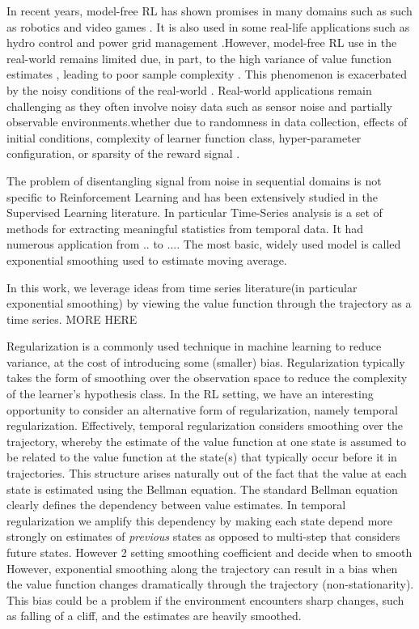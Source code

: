 In recent years, model-free RL has shown promises in many domains such as  such as robotics \citep{kober2013reinforcement,abbeel2010autonomous} and video games \citep{vinyals2017starcraft,mnih2013playing,mnih2016asynchronous}. It is also used in some real-life applications such as hydro control \citep{grinberg2014optimizing} and power grid management \citep{franccois2016deep}.However, model-free RL use in the real-world remains limited due, in part, to the high variance of value function estimates \citep{greensmith2004variance}, leading to poor sample complexity \citep{glascher2010states,kakade2003sample}. This phenomenon is exacerbated by the noisy conditions of the real-world \citep{fox2015taming,pendrith1994reinforcement}. Real-world applications remain challenging as they often involve noisy data such as sensor noise and partially observable environments.whether due to randomness in data collection, effects of initial conditions, complexity of learner function class, hyper-parameter configuration, or sparsity of the reward signal \citep{henderson2017deep}.
 
The problem of disentangling signal from noise in sequential domains is not specific to Reinforcement Learning and has been extensively studied in the Supervised Learning literature. In particular Time-Series analysis is a set of methods for extracting meaningful statistics from temporal data. It had numerous application from .. to .... The most basic, widely used model is called exponential smoothing used to estimate moving average.

 In this work, we leverage ideas from time series literature(in particular exponential smoothing) by viewing the value function through the trajectory as a time series. MORE HERE 

Regularization is a commonly used technique in machine learning to reduce variance, at the cost of introducing some (smaller) bias.  Regularization typically takes the form of smoothing over the observation space to reduce the complexity of the learner's hypothesis class. In the RL setting, we have an interesting opportunity to consider an alternative form of regularization, namely temporal regularization.  Effectively, temporal regularization considers smoothing over the trajectory, whereby the estimate of the value function at one state is assumed to be related to the value function at the state(s) that typically occur before it in trajectories. This structure arises naturally out of the fact that the value at each state is estimated using the Bellman equation. The standard Bellman equation clearly defines the dependency between value estimates. In temporal regularization we amplify this dependency by making each state depend more strongly on estimates of \emph{previous} states as opposed to multi-step that considers future states.  However 2 setting smoothing coefficient and decide when to smooth
However, exponential smoothing along the trajectory can result in a bias when the value function changes dramatically through the trajectory (non-stationarity). This bias could be a problem if the environment encounters sharp changes, such as falling of a cliff, and the estimates are heavily smoothed.

